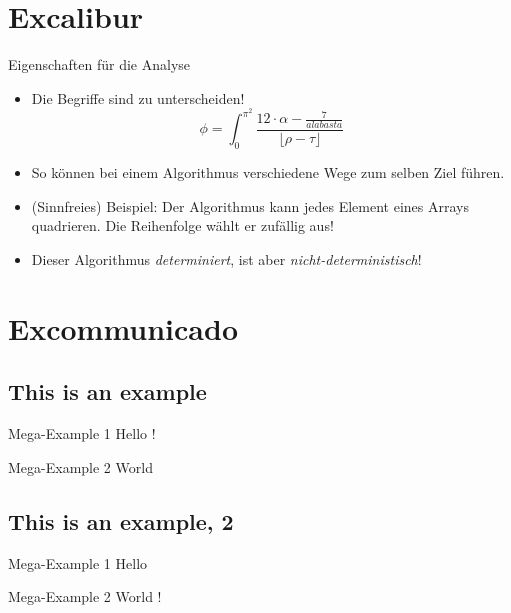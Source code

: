 \documentclass[aspectratio=169,usepdftitle=true,handout]{beamer}
\begin{document}
\section{Excalibur}
\begin{frame}[fragile]{Eigenschaften für die Analyse}
    \begin{itemize}
        \item Die Begriffe sind zu unterscheiden!
\begin{equation*}
    \phi = \int_0^{\pi^2} \frac{12 \cdot \alpha - \frac{7}{alabasta}}{\lfloor \rho - \tau\rfloor}
\end{equation*}
        \item So können bei einem Algorithmus verschiedene Wege zum selben Ziel führen.
        \item (Sinnfreies) Beispiel: Der Algorithmus kann jedes Element eines Arrays quadrieren. Die Reihenfolge wählt er zufällig aus!
        \item Dieser Algorithmus \emph{determiniert}, ist aber \emph{nicht-deterministisch}!
    \end{itemize}
\end{frame}

\section{Excommunicado}
\subsection{This is an example}

\begin{frame}{Mega-Example 1}
    Hello \cite{knuth-fa}!
\end{frame}

\begin{frame}{Mega-Example 2}
    World
\end{frame}

\subsection{This is an example, 2}

\begin{frame}{Mega-Example 1}
    Hello
\end{frame}

\begin{frame}{Mega-Example 2}
    World \cite{knuth-web}!
\end{frame}
\end{document}
